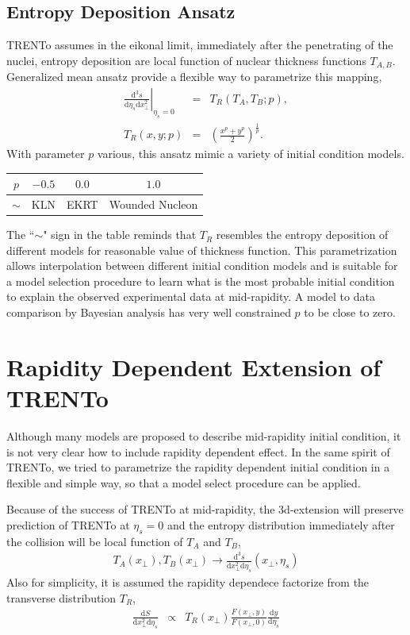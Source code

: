 \documentclass[aps,prl,twocolumn,groupedaddress]{revtex4-1}
\begin{document}
	\subsection{Entropy Deposition Ansatz}
	TRENTo assumes in the eikonal limit, immediately after the penetrating of the nuclei, entropy deposition are local function of nuclear thickness functions $T_{A,B}$. 
	Generalized mean ansatz provide a flexible way to parametrize this mapping,
	\begin{eqnarray}
	\left.\frac{\mathrm{d^3}s}{\mathrm{d}\eta_s \mathrm{d}x_\perp^2}\right\vert_{\eta_s = 0} &=& 	T_R\left(T_A, T_B; p\right),	\\
	T_R(x, y; p) &=& \left(\frac{x^p+y^p}{2}\right)^{\frac{1}{p}}.
	\end{eqnarray}
	With parameter $p$ various, this ansatz mimic a variety of initial condition models.
	\begin{center}
	\begin{tabular}{c|c|c|c}
	\hline
	$p$	&	$-0.5$	 	&	$0.0$ 		& 	$1.0$		\\
	\hline	
	$\sim$ &		KLN		& 	EKRT		& 		Wounded Nucleon \\
	\hline
	\end{tabular}
	\end{center}
	The ``$\sim$" sign in the table reminds that $T_R$ resembles the entropy deposition of different models for reasonable value of thickness function. 
	This parametrization allows interpolation between different initial condition models and is suitable for a model selection procedure to learn what is the most probable initial condition to explain the observed experimental data at mid-rapidity.
	A model to data comparison by Bayesian analysis has very well constrained $p$ to be close to zero.
\section{Rapidity Dependent Extension of TRENTo}
	Although many models are proposed to describe mid-rapidity initial condition, it is not very clear how to include rapidity dependent effect. In the same spirit of TRENTo, we tried to parametrize the rapidity dependent initial condition in a flexible and simple way, so that a model select procedure can be applied.
	
	Because of the success of TRENTo at mid-rapidity, the 3d-extension will preserve prediction of TRENTo at $\eta_s = 0$ and the entropy distribution immediately after the collision will be local function of $T_A$ and $T_B$,
	\begin{eqnarray}
	T_A(x_\perp), T_B(x_\perp) \rightarrow \frac{\mathrm{d^3}s}{\mathrm{d}x_{\perp}^2 \mathrm{d}\eta_s}\left(x_\perp, \eta_s\right)
	\end{eqnarray}
	Also for simplicity, it is assumed the rapidity dependece factorize from the transverse distribution $T_R$,
	\begin{eqnarray}
		\frac{\mathrm{d}S}{\mathrm{d}x_{\perp}^2 \mathrm{d}\eta_s}  &\propto& T_R(x_\perp) \frac{F(x_\perp,y)}{F(x_\perp,0)}\frac{\mathrm{d}y}{\mathrm{d}\eta_s}
	\end{eqnarray}
	
\end{document}
